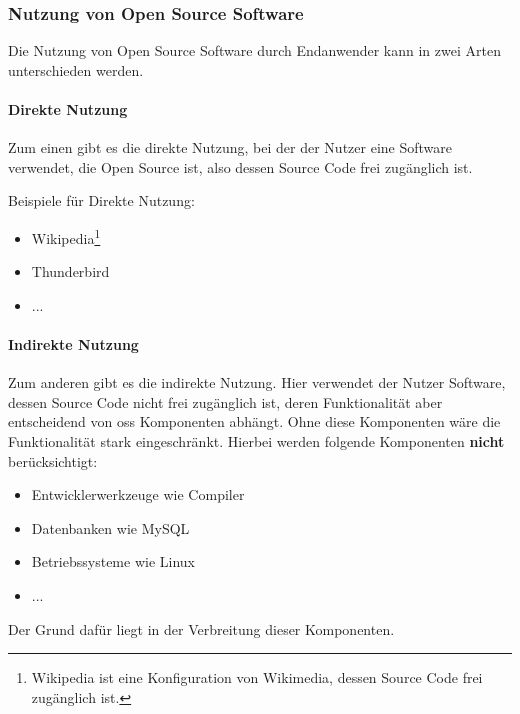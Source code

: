 \documentclass[a4paper]{article}
\begin{document}
            \subsubsection{Nutzung von Open Source Software}\label{section:indirekte_nutzung}
                Die Nutzung von Open Source Software durch Endanwender kann in zwei Arten unterschieden werden.
                
                \paragraph{Direkte Nutzung}
                    Zum einen gibt es die direkte Nutzung, bei der der Nutzer eine Software verwendet, die Open Source ist, also dessen Source Code frei zugänglich ist.
                    
                    Beispiele für Direkte Nutzung:
                    \begin{itemize}
                        \item Wikipedia\footnote{Wikipedia ist eine Konfiguration von Wikimedia, dessen Source Code frei zugänglich ist.}                        \item Thunderbird %
                        \item ... %
                    \end{itemize}
                    
                \paragraph{Indirekte Nutzung}
                    Zum anderen gibt es die indirekte Nutzung. Hier verwendet der Nutzer Software, dessen Source Code nicht frei zugänglich ist, deren Funktionalität aber entscheidend von \gls{oss} Komponenten abhängt. Ohne diese Komponenten wäre die Funktionalität stark eingeschränkt. Hierbei werden folgende Komponenten \textbf{nicht} berücksichtigt:
                    
                    \begin{itemize}
                        \item Entwicklerwerkzeuge wie Compiler
                        \item Datenbanken wie MySQL
                        \item Betriebssysteme wie Linux 
                        \item ... 
                    \end{itemize} %
                    Der Grund dafür liegt in der Verbreitung dieser Komponenten. %
                    
\end{document}
